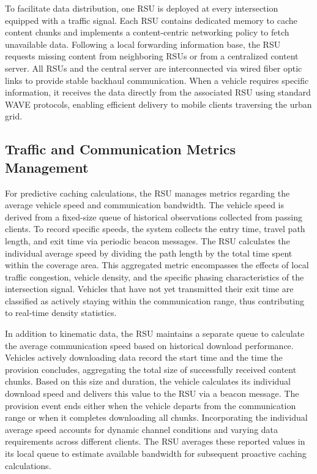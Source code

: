\documentclass[journal]{IEEEtran}
\begin{document}
To facilitate data distribution, one RSU is deployed at every intersection equipped with a traffic signal. Each RSU contains dedicated memory to cache content chunks and implements a content-centric networking policy to fetch unavailable data. Following a local forwarding information base, the RSU requests missing content from neighboring RSUs or from a centralized content server. All RSUs and the central server are interconnected via wired fiber optic links to provide stable backhaul communication. When a vehicle requires specific information, it receives the data directly from the associated RSU using standard WAVE protocols, enabling efficient delivery to mobile clients traversing the urban grid.

\subsection{Traffic and Communication Metrics Management} \label{sec.net.B}
For predictive caching calculations, the RSU manages metrics regarding the average vehicle speed and communication bandwidth. The vehicle speed is derived from a fixed-size queue of historical observations collected from passing clients. To record specific speeds, the system collects the entry time, travel path length, and exit time via periodic beacon messages. The RSU calculates the individual average speed by dividing the path length by the total time spent within the coverage area. This aggregated metric encompasses the effects of local traffic congestion, vehicle density, and the specific phasing characteristics of the intersection signal. Vehicles that have not yet transmitted their exit time are classified as actively staying within the communication range, thus contributing to real-time density statistics.

In addition to kinematic data, the RSU maintains a separate queue to calculate the average communication speed based on historical download performance. Vehicles actively downloading data record the start time and the time the provision concludes, aggregating the total size of successfully received content chunks. Based on this size and duration, the vehicle calculates its individual download speed and delivers this value to the RSU via a beacon message. The provision event ends either when the vehicle departs from the communication range or when it completes downloading all chunks. Incorporating the individual average speed accounts for dynamic channel conditions and varying data requirements across different clients. The RSU averages these reported values in its local queue to estimate available bandwidth for subsequent proactive caching calculations.
\end{document}
